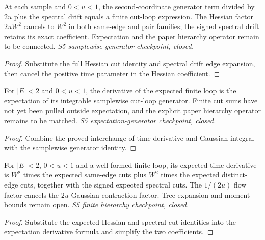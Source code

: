 \begin{lemma}
  \label{lem:loop-generator-samplewise}
  \leanok
  At each sample and $0<u<1$, the second-coordinate generator term divided
  by $2u$ plus the spectral drift equals a finite cut-loop expression.
  The Hessian factor $2uW^2$ cancels to $W^2$ in both same-edge and pair
  families; the signed spectral drift retains its exact coefficient.
  Expectation and the paper hierarchy operator remain to be connected.
  \emph{S5 samplewise generator checkpoint, closed.}
\end{lemma}
\begin{proof}\leanok
  Substitute the full Hessian cut identity and spectral drift edge expansion,
  then cancel the positive time parameter in the Hessian coefficient.
\end{proof}

\begin{lemma}
  \label{lem:loop-generator-expectation}
  \leanok
  For $|E|<2$ and $0<u<1$, the derivative of the expected finite loop is
  the expectation of its integrable samplewise cut-loop generator. Finite
  cut sums have not yet been pulled outside expectation, and the explicit
  paper hierarchy operator remains to be matched.
  \emph{S5 expectation-generator checkpoint, closed.}
\end{lemma}
\begin{proof}\leanok
  Combine the proved interchange of time derivative and Gaussian integral
  with the samplewise generator identity.
\end{proof}

\begin{lemma}
  \label{lem:loop-hierarchy-generator}
  \leanok
  For $|E|<2$, $0<u<1$ and a well-formed finite loop, its expected time
  derivative is $W^2$ times the expected same-edge cuts plus $W^2$ times
  the expected distinct-edge cuts, together with the signed expected
  spectral cuts. The $1/(2u)$ flow factor cancels the $2u$ Gaussian
  contraction factor. Tree expansion and moment bounds remain open.
  \emph{S5 finite hierarchy checkpoint, closed.}
\end{lemma}
\begin{proof}\leanok
  Substitute the expected Hessian and spectral cut identities into the
  expectation derivative formula and simplify the two coefficients.
\end{proof}

